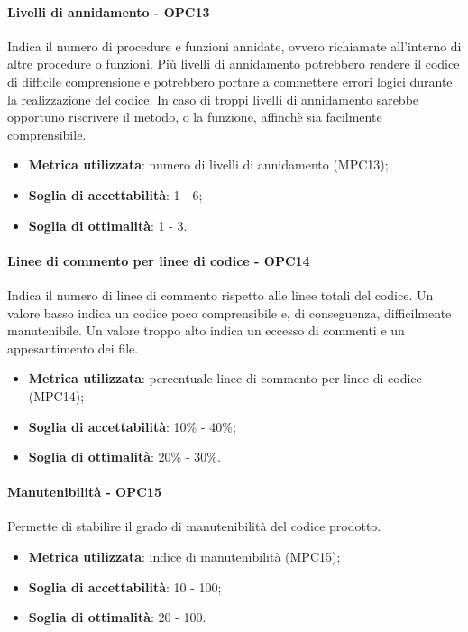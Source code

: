 \documentclass[PdQ.tex]{subfiles}
\begin{document}
			\paragraph{Livelli di annidamento - OPC13}
				Indica il numero di procedure e funzioni annidate, ovvero richiamate all'interno di altre procedure o funzioni. Più livelli di annidamento
				potrebbero rendere il codice di difficile comprensione e potrebbero portare a commettere errori logici durante la realizzazione del codice.
				In caso di troppi livelli di annidamento sarebbe opportuno riscrivere il metodo, o la funzione, affinchè sia facilmente comprensibile.
				\begin{itemize}
					\item \textbf{Metrica utilizzata}: numero di livelli di annidamento (MPC13);
					\item \textbf{Soglia di accettabilità}: 1 - 6;
					\item \textbf{Soglia di ottimalità}: 1 - 3.
				\end{itemize}

			\paragraph{Linee di commento per linee di codice - OPC14}
				Indica il numero di linee di commento rispetto alle linee totali del codice. Un valore basso indica un codice poco comprensibile
				e, di conseguenza, difficilmente manutenibile. Un valore troppo alto indica un eccesso di commenti e un appesantimento dei file.
				\begin{itemize}
					\item \textbf{Metrica utilizzata}: percentuale linee di commento per linee di codice (MPC14);
					\item \textbf{Soglia di accettabilità}: 10\% - 40\%;
					\item \textbf{Soglia di ottimalità}: 20\% - 30\%.
				\end{itemize}


			\paragraph{Manutenibilità - OPC15}
				Permette di stabilire il grado di manutenibilità del codice prodotto.
				\begin{itemize}
					\item \textbf{Metrica utilizzata}: indice di manutenibilità (MPC15);
					\item \textbf{Soglia di accettabilità}: 10 - 100;
					\item \textbf{Soglia di ottimalità}: 20 - 100.
				\end{itemize}
\end{document}
